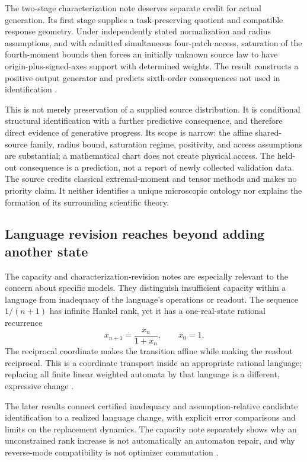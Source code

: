 \documentclass[11pt]{article}
\begin{document}
The two-stage characterization note deserves separate credit for actual generation. Its first stage supplies a task-preserving quotient and compatible response geometry. Under independently stated normalization and radius assumptions, and with admitted simultaneous four-patch access, saturation of the fourth-moment bounds then forces an initially unknown source law to have origin-plus-signed-axes support with determined weights. The result constructs a positive output generator and predicts sixth-order consequences not used in identification \cite[Radius saturation, The whole-family output generator, and A held out sixth order consequence]{TwoStage}.

This is not merely preservation of a supplied source distribution. It is conditional structural identification with a further predictive consequence, and therefore direct evidence of generative progress. Its scope is narrow: the affine shared-source family, radius bound, saturation regime, positivity, and access assumptions are substantial; a mathematical chart does not create physical access. The held-out consequence is a prediction, not a report of newly collected validation data. The source credits classical extremal-moment and tensor methods and makes no priority claim. It neither identifies a unique microscopic ontology nor explains the formation of its surrounding scientific theory.

\subsection{Language revision reaches beyond adding another state}
\label{sec:language-result}

The capacity and characterization-revision notes are especially relevant to the concern about specific models. They distinguish insufficient capacity within a language from inadequacy of the language's operations or readout. The sequence $1/(n+1)$ has infinite Hankel rank, yet it has a one-real-state rational recurrence
\[
 x_{n+1}=\frac{x_n}{1+x_n},\qquad x_0=1.
\]
The reciprocal coordinate makes the transition affine while making the readout reciprocal. This is a coordinate transport inside an appropriate rational language; replacing all finite linear weighted automata by that language is a different, expressive change \cite[Exact and approximate expressive separation]{LanguageRevision}.

The later results connect certified inadequacy and assumption-relative candidate identification to a realized language change, with explicit error comparisons and limits on the replacement dynamics. The capacity note separately shows why an unconstrained rank increase is not automatically an automaton repair, and why reverse-mode compatibility is not optimizer commutation \cite{Capacity,LanguageRevision}.
\end{document}
